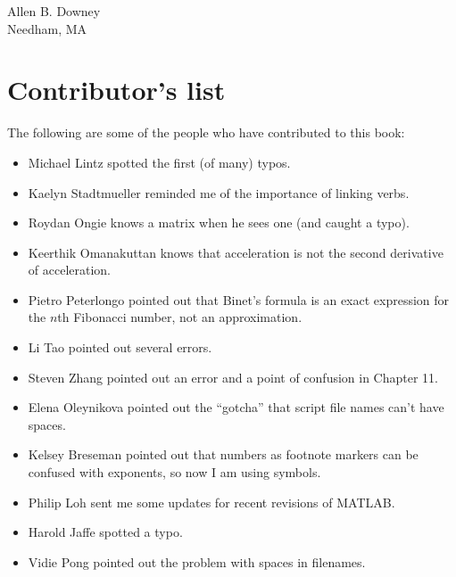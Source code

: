 \documentclass{book}
\begin{document}
\noindent Allen B. Downey \\
\noindent Needham, MA \\

\vspace{0.1in}

\section*{Contributor's list}

The following are some of the people who have contributed to this
book:

\begin{itemize}

\item Michael Lintz spotted the first (of many) typos.

\item Kaelyn Stadtmueller reminded me of the importance of linking
verbs.

\item Roydan Ongie knows a matrix when he sees one (and caught a typo).

\item Keerthik Omanakuttan knows that acceleration is not the
second derivative of acceleration.

\item Pietro Peterlongo pointed out that Binet's formula is an
exact expression for the $n$th Fibonacci number, not an approximation.

\item Li Tao pointed out several errors.

\item Steven Zhang pointed out an error and a point of confusion
in Chapter 11.

\item Elena Oleynikova pointed out the ``gotcha'' that script file names
can't have spaces.

\item Kelsey Breseman pointed out that numbers as footnote markers
can be confused with exponents, so now I am using symbols.

\item Philip Loh sent me some updates for recent revisions of MATLAB.

\item Harold Jaffe spotted a typo.

\item Vidie Pong pointed out the problem with spaces in filenames.


\end{itemize}
\end{document}
